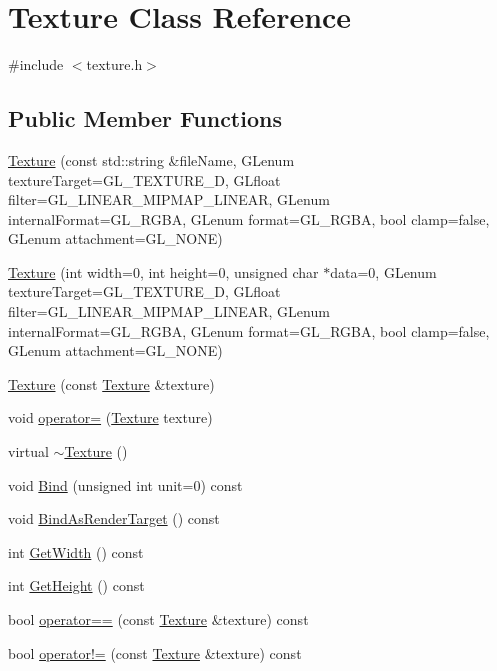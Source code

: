 \hypertarget{class_texture}{}\section{Texture Class Reference}
\label{class_texture}


{\ttfamily \#include $<$texture.\+h$>$}

\subsection*{Public Member Functions}
\begin{DoxyCompactItemize}
\item 
\hyperlink{class_texture_a211502d1cdd7812326479b1e72b09480}{Texture} (const std\+::string \&file\+Name, G\+Lenum texture\+Target=G\+L\+\_\+\+T\+E\+X\+T\+U\+R\+E\+\_\+D, G\+Lfloat filter=G\+L\+\_\+\+L\+I\+N\+E\+A\+R\+\_\+\+M\+I\+P\+M\+A\+P\+\_\+\+L\+I\+N\+E\+A\+R, G\+Lenum internal\+Format=G\+L\+\_\+\+R\+G\+B\+A, G\+Lenum format=G\+L\+\_\+\+R\+G\+B\+A, bool clamp=false, G\+Lenum attachment=G\+L\+\_\+\+N\+O\+N\+E)
\item 
\hyperlink{class_texture_a05bec6390054493eb8780da55cc98ffb}{Texture} (int width=0, int height=0, unsigned char $\ast$data=0, G\+Lenum texture\+Target=G\+L\+\_\+\+T\+E\+X\+T\+U\+R\+E\+\_\+D, G\+Lfloat filter=G\+L\+\_\+\+L\+I\+N\+E\+A\+R\+\_\+\+M\+I\+P\+M\+A\+P\+\_\+\+L\+I\+N\+E\+A\+R, G\+Lenum internal\+Format=G\+L\+\_\+\+R\+G\+B\+A, G\+Lenum format=G\+L\+\_\+\+R\+G\+B\+A, bool clamp=false, G\+Lenum attachment=G\+L\+\_\+\+N\+O\+N\+E)
\item 
\hyperlink{class_texture_a21822d3a487c6a803f706869fe46faa2}{Texture} (const \hyperlink{class_texture}{Texture} \&texture)
\item 
void \hyperlink{class_texture_ac8d4a47a87bb660ecd37b7ec7a70705b}{operator=} (\hyperlink{class_texture}{Texture} texture)
\item 
virtual \hyperlink{class_texture_a09c4bcb7462f64c1d20fa69dba3cee8a}{$\sim$\+Texture} ()
\item 
void \hyperlink{class_texture_a6f54dde94704d5f2b90c63f33c67793c}{Bind} (unsigned int unit=0) const 
\item 
void \hyperlink{class_texture_a4e8799fb199b39f37e6f2cd33891ecfd}{Bind\+As\+Render\+Target} () const 
\item 
int \hyperlink{class_texture_a1add92fc879f766aed5d39a3ef41c7cb}{Get\+Width} () const 
\item 
int \hyperlink{class_texture_adea6f153fb9fa3ac1558f4d96641e47d}{Get\+Height} () const 
\item 
bool \hyperlink{class_texture_aca3540da8292ba7dd02e6f1dbda781cc}{operator==} (const \hyperlink{class_texture}{Texture} \&texture) const 
\item 
bool \hyperlink{class_texture_abdd611487e4502e4cda4a41551bbb6f8}{operator!=} (const \hyperlink{class_texture}{Texture} \&texture) const 
\end{DoxyCompactItemize}


